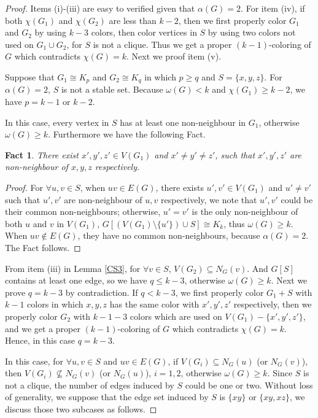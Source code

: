 \documentclass[12pt]{article}
\newtheorem{fact}{Fact}
\theoremstyle{definition}
\begin{document}
\begin{proof} Items (i)-(iii) are easy to verified given that $\alpha(G)=2$. For item (iv), if both $\chi(G_1)$ and $\chi(G_2)$ are less than $k-2$, then we first properly color $G_1$ and $G_2$ by using $k-3$ colors, then color vertices in $S$ by using two colors not used on $G_1\cup G_2$, for $S$ is not a clique. Thus we get a proper $(k-1)$-coloring of $G$ which contradicts $\chi(G)=k$. Next we proof item (v).

Suppose that $G_1\cong K_p$ and $G_2\cong K_q$ in which $p\geq q$ and $S=\{x,y,z\}$. For $\alpha(G)=2$, $S$ is not a stable set.
Because $\omega(G)< k$ and $\chi(G_1)\geq k-2$, we have $p=k-1$ or $k-2$.


In this case, every vertex in $S$ has at least one non-neighbour in $G_1$, otherwise $\omega(G)\geq k$. Furthermore we have the following Fact.

\begin{fact}There exist $x',y',z'\in V(G_1)$ and $x'\neq y'\neq z'$, such that $x',y',z'$ are non-neighbour of $x,y,z$ respectively.
\end{fact}

\begin{proof} For $\forall u,v\in S$, when $uv\in E(G)$, there exists $u',v'\in V(G_1)$ and $u'\neq v'$ such that $u',v'$ are non-neighbour of $u,v$ respectively, we note that $u',v'$ could be their common non-neighbours; otherwise, $u'=v'$ is the only non-neighbour of both $u$ and $v$ in $V(G_1)$, $G[(V(G_1)\setminus \{u'\})\cup S]\cong K_k$, thus $\omega(G)\geq k$. When $uv\not\in E(G)$, they have no common non-neighbours, because $\alpha(G)=2$. The Fact follows.
\end{proof}

From item (iii) in Lemma \ref{CS3}, for $\forall v\in S$, $V(G_2)\subseteq N_{G}(v)$. And $G[S]$ contains at least one edge, so we have $q\leq k-3$, otherwise $\omega (G)\geq k$. Next we prove $q=k-3$ by contradiction. If $q< k-3$, we first
properly color $G_1+S$ with $k-1$ colors in which $x,y,z$ has the same color with $x',y',z'$ respectively,
then we properly color $G_2$ with $k-1-3$ colors which are used on $V(G_1)-\{x',y',z'\}$, and we get a proper $(k-1)$-coloring of $G$ which contradicts $\chi(G)=k$. Hence, in this case $q=k-3$.


In this case, for $\forall u,v\in S$ and $uv\in E(G)$, if $V(G_i)\subseteq N_{G}(u)$ (or $N_{G}(v)$), then $V(G_i)\not\subseteq N_{G}(v)$ (or $N_{G}(u)$), $i=1,2$, otherwise $\omega(G)\geq k$. Since $S$ is not a clique, the number of edges induced by $S$ could be one or two.  Without loss of generality, we suppose that the edge set induced by $S$ is $\{xy\}$ or $\{xy,xz\}$, we discuss those two subcases as follows.


\end{proof}
\end{document}
